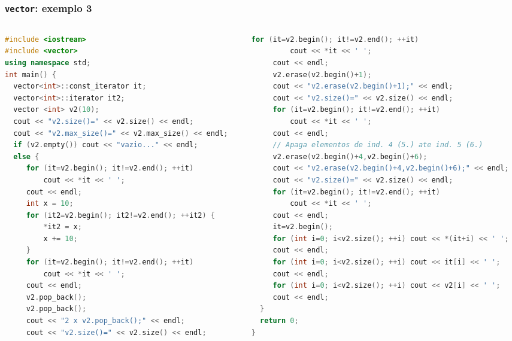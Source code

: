 \documentclass[xcolor={dvipsnames,table},aspectratio=169]{beamer}
\begin{document}
\begin{frame}[fragile]\frametitle{\texttt{vector}: exemplo 3}
\begin{columns}
\begin{column}{0.46\linewidth}
\begin{lstlisting}[language=C++,basicstyle=\ttfamily\tiny]
#include <iostream>
#include <vector>
using namespace std;
int main() {
  vector<int>::const_iterator it;
  vector<int>::iterator it2;
  vector <int> v2(10);
  cout << "v2.size()=" << v2.size() << endl;
  cout << "v2.max_size()=" << v2.max_size() << endl;
  if (v2.empty()) cout << "vazio..." << endl;
  else {
     for (it=v2.begin(); it!=v2.end(); ++it)
         cout << *it << ' ';
     cout << endl;
     int x = 10;
     for (it2=v2.begin(); it2!=v2.end(); ++it2) {
         *it2 = x;
         x += 10;
     }
     for (it=v2.begin(); it!=v2.end(); ++it)
         cout << *it << ' ';
     cout << endl;
     v2.pop_back();
     v2.pop_back();
     cout << "2 x v2.pop_back();" << endl;
     cout << "v2.size()=" << v2.size() << endl;
\end{lstlisting}
\end{column}
\begin{column}{0.54\linewidth}
\begin{lstlisting}[language=C++,basicstyle=\ttfamily\tiny]
     for (it=v2.begin(); it!=v2.end(); ++it)
         cout << *it << ' ';
     cout << endl;
     v2.erase(v2.begin()+1);
     cout << "v2.erase(v2.begin()+1);" << endl;
     cout << "v2.size()=" << v2.size() << endl;
     for (it=v2.begin(); it!=v2.end(); ++it)
         cout << *it << ' ';
     cout << endl;
     // Apaga elementos de ind. 4 (5.) ate ind. 5 (6.)
     v2.erase(v2.begin()+4,v2.begin()+6);
     cout << "v2.erase(v2.begin()+4,v2.begin()+6);" << endl;
     cout << "v2.size()=" << v2.size() << endl;
     for (it=v2.begin(); it!=v2.end(); ++it)
         cout << *it << ' ';
     cout << endl;
     it=v2.begin();
     for (int i=0; i<v2.size(); ++i) cout << *(it+i) << ' ';
     cout << endl;
     for (int i=0; i<v2.size(); ++i) cout << it[i] << ' ';
     cout << endl;
     for (int i=0; i<v2.size(); ++i) cout << v2[i] << ' ';
     cout << endl;
  }
  return 0;
}
\end{lstlisting}
\end{column}
\end{columns}
\end{frame}
\end{document}
